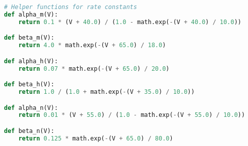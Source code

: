 \begin{lstlisting}[language=Python, caption={Helper functions representing the $\alpha$ and $\beta$}, label={lst:hodgkin-huxleymodelHelper}]
# Helper functions for rate constants
def alpha_m(V):
	return 0.1 * (V + 40.0) / (1.0 - math.exp(-(V + 40.0) / 10.0))

def beta_m(V):
	return 4.0 * math.exp(-(V + 65.0) / 18.0)

def alpha_h(V):
	return 0.07 * math.exp(-(V + 65.0) / 20.0)

def beta_h(V):
	return 1.0 / (1.0 + math.exp(-(V + 35.0) / 10.0))

def alpha_n(V):
	return 0.01 * (V + 55.0) / (1.0 - math.exp(-(V + 55.0) / 10.0))

def beta_n(V):
	return 0.125 * math.exp(-(V + 65.0) / 80.0)
\end{lstlisting}